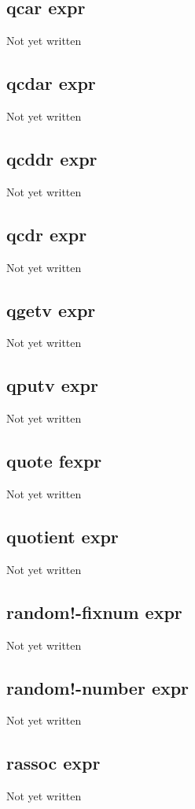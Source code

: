 \documentclass[a4paper,11pt]{article}
\begin{document}
\subsection{\ttfamily qcar expr}
Not yet written

\subsection{\ttfamily qcdar expr}
Not yet written

\subsection{\ttfamily qcddr expr}
Not yet written

\subsection{\ttfamily qcdr expr}
Not yet written

\subsection{\ttfamily qgetv expr}
Not yet written

\subsection{\ttfamily qputv expr}
Not yet written

\subsection{\ttfamily quote fexpr}
Not yet written

\subsection{\ttfamily quotient expr}
Not yet written

\subsection{\ttfamily random!-fixnum expr}
Not yet written

\subsection{\ttfamily random!-number expr}
Not yet written

\subsection{\ttfamily rassoc expr}
Not yet written
\end{document}
